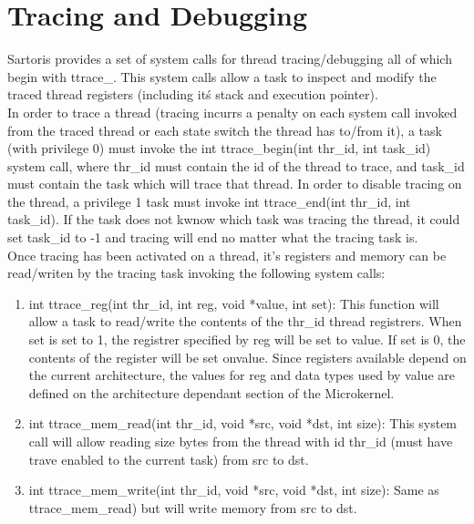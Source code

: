 \documentclass[11pt, letterpaper, twoside, english]{book}
\begin{document}
\section{Tracing and Debugging} \label{sec:tracing}

Sartoris provides a set of system calls for thread tracing/debugging all of which begin with \textsf{ttrace\_}. This system calls allow a task to inspect and modify the traced thread registers (including it\'s stack and execution pointer).\\

In order to trace a thread (tracing incurrs a penalty on each system call invoked from the traced thread or each state switch the thread has to/from it), a task (with privilege 0) must invoke the \textsf{int ttrace\_begin(int thr\_id, int task\_id)} system call, where \textsf{thr\_id} must contain the id of the thread to trace, and \textsf{task\_id} must contain the task which will trace that thread. In order to disable tracing on the thread, a privilege 1 task must invoke \textsf{int ttrace\_end(int thr\_id, int task\_id)}. If the task does not kwnow which task was tracing the thread, it could set \textsf{task\_id} to -1 and tracing will end no matter what the tracing task is.\\

Once tracing has been activated on a thread, it's registers and memory can be read/writen by the tracing task invoking the following system calls:

\begin{enumerate}
\item[] \textsf{int ttrace\_reg(int thr\_id, int reg, void *value, int set)}: This function will allow a task to read/write the contents of the \textsf{thr\_id} thread registrers. When \textsf{set} is set to 1, the registrer specified by \textsf{reg} will be set to \textsf{value}. If \textsf{set} is 0, the contents of the register will be set on\textsf{value}. Since registers available depend on the current architecture, the values for \textsf{reg} and data types used by \textsf{value} are defined on the architecture dependant section of the Microkernel.
\item[] \textsf{int ttrace\_mem\_read(int thr\_id, void *src, void *dst, int size)}: This system call will allow reading \textsf{size} bytes from the thread with id \textsf{thr\_id} (must have trave enabled to the current task) from \textsf{src} to \textsf{dst}.
\item[] \textsf{int ttrace\_mem\_write(int thr\_id, void *src, void *dst, int size)}: Same as \textsf{ttrace\_mem\_read}) but will write memory from \textsf{src} to \textsf{dst}.
\end{enumerate}
\end{document}

